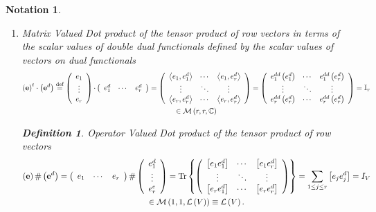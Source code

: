 \documentclass[aps,preprint]{revtex4}%
\newtheorem{definition}[theorem]{Definition}
\newtheorem{notation}[theorem]{Notation}
\begin{document}
\begin{notation}
\begin{enumerate}
\item \emph{Matrix Valued Dot} product of the tensor product of row vectors in
terms of the scalar values of \emph{double }dual functionals defined by the
scalar values of vectors on dual functionals
\begin{gather}
\left(  \mathbf{e}\right)  ^{t}\cdot\left(  \mathbf{e}^{d}\right)
\overset{\text{def}}{=}\left(
\begin{array}
[c]{c}%
e_{1}\\
\vdots\\
e_{r}%
\end{array}
\right)  \mathbf{\cdot}\left(
\begin{array}
[c]{ccc}%
e_{1}^{d} & \cdots & e_{r}^{d}%
\end{array}
\right)  =\left(
\begin{array}
[c]{ccc}%
\left\langle e_{1},e_{1}^{d}\right\rangle  & \cdots & \left\langle e_{1}%
,e_{r}^{d}\right\rangle \\
\vdots & \ddots & \vdots\\
\left\langle e_{r},e_{r}^{d}\right\rangle  & \cdots & \left\langle e_{r}%
,e_{r}^{d}\right\rangle
\end{array}
\right)  =\left(
\begin{array}
[c]{ccc}%
e_{1}^{dd}\left(  e_{1}^{d}\right)  & \cdots & e_{1}^{dd}\left(  e_{r}%
^{d}\right) \\
\vdots & \ddots & \vdots\\
e_{r}^{dd}\left(  e_{r}^{d}\right)  & \cdots & e_{r}^{dd}\left(  e_{r}%
^{d}\right)
\end{array}
\right)  =\mathbb{I}_{r}\\
\in\mathcal{M}\left(  r,r,\mathbb{C}\right)
\end{gather}


\begin{definition}
\emph{Operator Valued Dot} product of the tensor product of row vectors
\begin{gather}
\left(  \mathbf{e}\right)  \#\left(  \mathbf{e}^{d}\right)  =\left(
\begin{array}
[c]{ccc}%
e_{1} & \cdots & e_{r}%
\end{array}
\right)  \mathbf{\#}\left(
\begin{array}
[c]{c}%
e_{1}^{d}\\
\vdots\\
e_{r}^{e}%
\end{array}
\right)  =\operatorname{Tr}\left\{  \left(
\begin{array}
[c]{ccc}%
\left[  e_{1}e_{1}^{d}\right]  & \cdots & \left[  e_{1}e_{r}^{d}\right] \\
\vdots & \ddots & \vdots\\
\left[  e_{r}e_{1}^{d}\right]  & \cdots & \left[  e_{r}e_{r}^{d}\right]
\end{array}
\right)  \right\}  =\sum_{1\leq j\leq r}\left[  e_{j}e_{j}^{d}\right]
=I_{V}\\
\in\mathcal{M}\left(  1,1,\mathcal{L}\left(  V\right)  \right)  \equiv
\mathcal{L}\left(  V\right)  .
\end{gather}


\end{definition}
\end{enumerate}
\end{notation}
\end{document}
